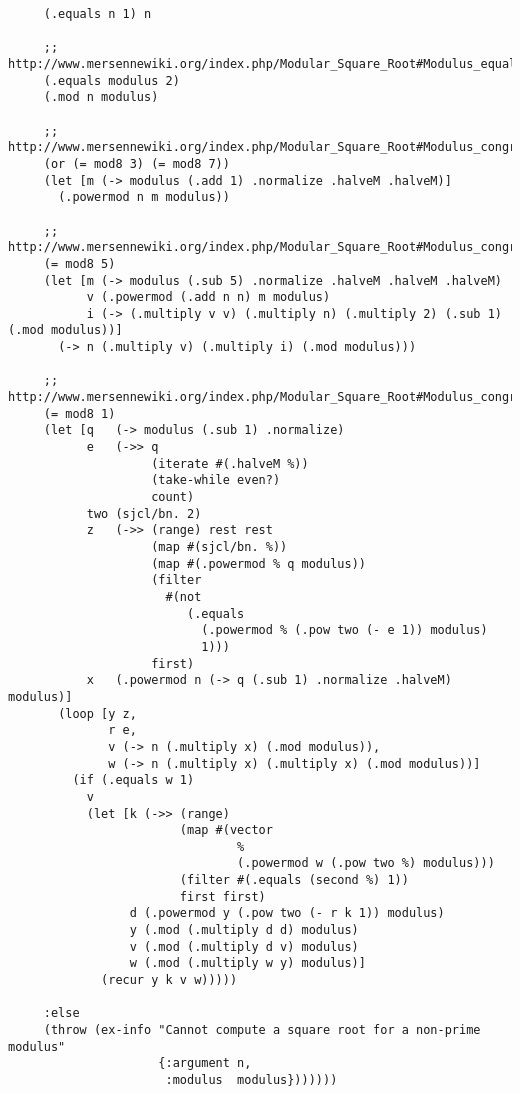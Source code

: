\documentclass[
]{article}
\begin{document}
\begin{verbatim}
     (.equals n 1) n 

     ;; http://www.mersennewiki.org/index.php/Modular_Square_Root#Modulus_equal_to_2 
     (.equals modulus 2) 
     (.mod n modulus) 

     ;; http://www.mersennewiki.org/index.php/Modular_Square_Root#Modulus_congruent_to_3_modulo_4 
     (or (= mod8 3) (= mod8 7)) 
     (let [m (-> modulus (.add 1) .normalize .halveM .halveM)] 
       (.powermod n m modulus)) 

     ;; http://www.mersennewiki.org/index.php/Modular_Square_Root#Modulus_congruent_to_5_modulo_8 
     (= mod8 5) 
     (let [m (-> modulus (.sub 5) .normalize .halveM .halveM .halveM) 
           v (.powermod (.add n n) m modulus) 
           i (-> (.multiply v v) (.multiply n) (.multiply 2) (.sub 1) (.mod modulus))] 
       (-> n (.multiply v) (.multiply i) (.mod modulus))) 

     ;; http://www.mersennewiki.org/index.php/Modular_Square_Root#Modulus_congruent_to_1_modulo_8 
     (= mod8 1) 
     (let [q   (-> modulus (.sub 1) .normalize) 
           e   (->> q 
                    (iterate #(.halveM %)) 
                    (take-while even?) 
                    count) 
           two (sjcl/bn. 2) 
           z   (->> (range) rest rest 
                    (map #(sjcl/bn. %)) 
                    (map #(.powermod % q modulus)) 
                    (filter 
                      #(not 
                         (.equals 
                           (.powermod % (.pow two (- e 1)) modulus) 
                           1))) 
                    first) 
           x   (.powermod n (-> q (.sub 1) .normalize .halveM) modulus)] 
       (loop [y z, 
              r e, 
              v (-> n (.multiply x) (.mod modulus)), 
              w (-> n (.multiply x) (.multiply x) (.mod modulus))] 
         (if (.equals w 1) 
           v 
           (let [k (->> (range) 
                        (map #(vector 
                                % 
                                (.powermod w (.pow two %) modulus))) 
                        (filter #(.equals (second %) 1)) 
                        first first) 
                 d (.powermod y (.pow two (- r k 1)) modulus) 
                 y (.mod (.multiply d d) modulus) 
                 v (.mod (.multiply d v) modulus) 
                 w (.mod (.multiply w y) modulus)] 
             (recur y k v w))))) 

     :else 
     (throw (ex-info "Cannot compute a square root for a non-prime modulus" 
                     {:argument n, 
                      :modulus  modulus})))))) 
\end{verbatim}
\end{document}
